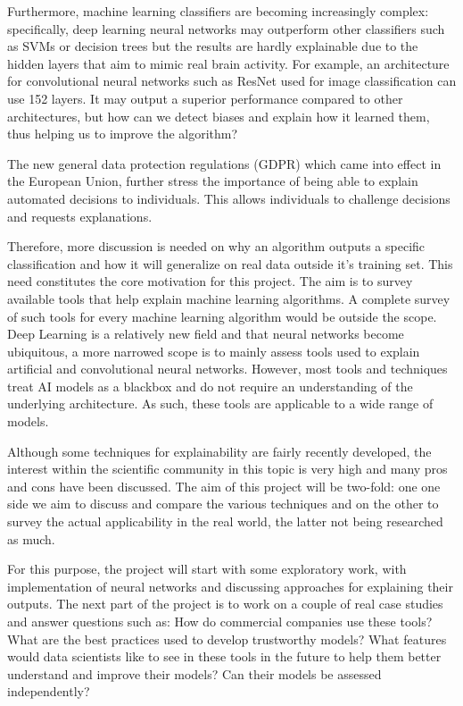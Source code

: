 \documentclass[proposal]{softeng}
\begin{document}
Furthermore, machine learning classifiers are becoming increasingly complex: specifically, deep learning neural networks may outperform other classifiers such as SVMs or decision trees but the results are hardly explainable due to the hidden layers that aim to mimic real brain activity. For example, an architecture for convolutional neural networks such as ResNet\cite{res-net} used for image classification can use 152 layers. It may output a superior performance compared to other architectures, but how can we detect biases and explain how it learned them, thus helping us to improve the algorithm?

The new general data protection regulations (GDPR) which came into effect in the European Union, further stress the importance of being able to explain automated decisions to individuals. This allows individuals to challenge decisions \cite{gdpr} and requests explanations.

Therefore, more discussion is needed on why an algorithm outputs a specific classification and how it will generalize on real data outside it's training set. This need constitutes the core motivation for this project. The aim is to survey available tools that help explain machine learning algorithms. A complete survey of such tools for every machine learning algorithm would be outside the scope. Deep Learning is a relatively new field and that neural networks become ubiquitous, a more narrowed scope is to mainly assess tools used to explain artificial and convolutional neural networks. However, most tools and techniques treat AI models as a blackbox and do not require an understanding of the underlying architecture. As such, these tools are applicable to a wide range of models.

Although some techniques for explainability are fairly recently developed, the interest within the scientific community in this topic is very high and many pros and cons have been discussed. The aim of this project will be two-fold: one one side we aim to discuss and compare the various techniques and on the other to survey the actual applicability in the real world, the latter not being researched as much. 

For this purpose, the project will start with some exploratory work, with implementation of neural networks and discussing approaches for explaining their outputs. The next part of the project is to work on a couple of real case studies and answer questions such as: How do commercial companies use these tools? What are the best practices used to develop trustworthy models? What features would data scientists like to see in these tools in the future to help them better understand and improve their models? Can their models be assessed independently?
\end{document}
